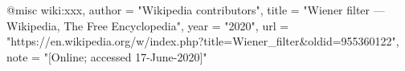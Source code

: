   @misc{ wiki:xxx,
    author = "{Wikipedia contributors}",
    title = "Wiener filter --- {Wikipedia}{,} The Free Encyclopedia",
    year = "2020",
    url = "https://en.wikipedia.org/w/index.php?title=Wiener_filter&oldid=955360122",
    note = "[Online; accessed 17-June-2020]"
  }
